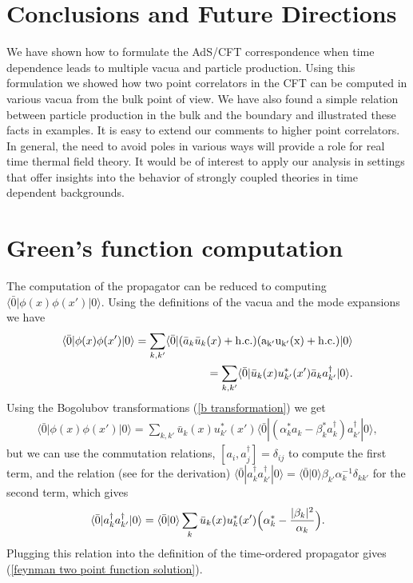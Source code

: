 \documentclass[a4paper,aps,prd,preprintnumbers,groupedaddress]{revtex4}
\begin{document}
\section{Conclusions and Future Directions} \label{conclusions}
We have shown how to formulate the AdS/CFT correspondence when time dependence leads to multiple vacua and particle production. Using this
formulation we showed how two point correlators in the CFT can be computed in various vacua from the bulk point of view. We have also found a
simple relation between particle production in the bulk and the boundary and illustrated these facts in examples.  It is easy to extend our comments to higher point correlators.  In general, the need to avoid poles in various ways will provide a role for real time thermal field theory.   It would be of interest to apply our analysis in settings that offer insights into the behavior of strongly coupled theories in time dependent backgrounds.




\appendix
\section{Green's function computation}
The computation of the propagator can be reduced to computing $\langle \bar{0} | \phi(x) \phi (x') | 0 \rangle$. Using the definitions of
the vacua and the mode expansions we have
\begin{eqnarray}
\langle \bar{0} | \phi(x) \phi (x') | 0 \rangle= \sum_{k,k'} \langle \bar{0} | (\bar{a}_k \bar{u}_k(x)+ \rm{h.c.})(a_{k'} u_{k'}(x)
+\rm{h.c.})|0\rangle
\nonumber \\
=\sum_{k,k'} \langle \bar{0} | \bar{u}_k(x) u_{k'}^*(x') \bar{a}_k a_{k'} ^\dagger|0\rangle .
\end{eqnarray}
Using the Bogolubov transformations (\ref{b transformation}) we get
\begin{eqnarray}
\langle \bar{0} | \phi(x) \phi (x') | 0 \rangle=\sum_{k,k'} \bar{u}_k(x) u_{k'}^* (x') \langle\bar{0} | (\alpha_k ^*a_k -\beta_k ^* a_k
^\dagger) a_{k'} ^\dagger|0\rangle ,
\end{eqnarray}
but we can use the commutation relations, $[a_i,a_j^\dagger]=\delta_{ij}$ to compute the first term, and the relation (see \cite{dewitt} for
the derivation) $\langle \bar{0}| a_k ^\dagger a_{k'} ^\dagger |0 \rangle=\langle \bar{0}|0 \rangle \beta_{k'} \alpha_k ^{-1} \delta_{kk'} $
for the second term, which gives
\begin{eqnarray}
\langle \bar{0}| a_k ^\dagger a_{k'} ^\dagger |0 \rangle= \langle \bar{0}|0\rangle \sum_k \bar{u}_k(x) u_k^* (x') \Bigl( \alpha_k^* -
\frac{|\beta_k|^2}{\alpha_k} \Bigr) .
\end{eqnarray}
Plugging this relation into the definition of the time-ordered propagator gives (\ref{feynman two point function solution}).
\end{document}
